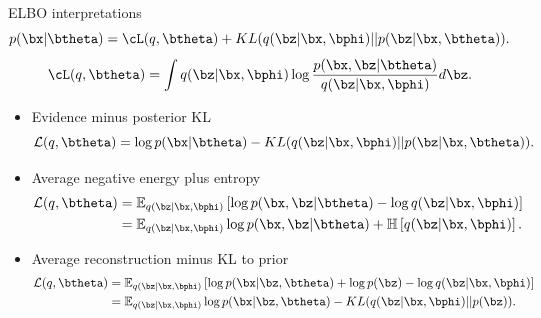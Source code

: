 \begin{frame}{ELBO interpretations}
	\[
		p(\bx | \btheta) = \cL (q, \btheta) + KL(q(\bz | \bx, \bphi) || p(\bz | \bx, \btheta)).
	\]
	\[
		\cL (q, \btheta) = \int q(\bz | \bx, \bphi) \log \frac{p(\bx, \bz | \btheta)}{q(\bz | \bx, \bphi)} d \bz.
	\]
	\begin{itemize}
	    \item Evidence minus posterior KL
	    \vspace{-0.1cm}
	    \[
	        \mathcal{L}(q, \btheta) = \log p(\bx | \btheta) - KL(q(\bz | \bx, \bphi) || p(\bz | \bx, \btheta)).
	    \]
	    \item Average negative energy plus entropy
	    \vspace{-0.1cm}
	    \begin{align*}
	        \mathcal{L}(q, \btheta) &= \mathbb{E}_{q(\bz | \bx, \bphi)} \left[\log p(\bx, \bz | \btheta) - \log q(\bz | \bx, \bphi)  \right] \\
	        &= \mathbb{E}_{q(\bz | \bx, \bphi)} \log p(\bx, \bz | \btheta) + \mathbb{H} \left[q(\bz | \bx, \bphi) \right].
	    \end{align*}
	    \item Average reconstruction minus KL to prior
	    \vspace{-0.1cm}
	    \begin{align*}
	        \mathcal{L}(q, \btheta) &= \mathbb{E}_{q(\bz | \bx, \bphi)} \left[ \log p(\bx | \bz, \btheta) + \log p(\bz) - \log q(\bz | \bx, \bphi) \right] \\
	        &= \mathbb{E}_{q(\bz | \bx, \bphi)} \log p(\bx | \bz, \btheta) - KL(q(\bz | \bx, \bphi) || p(\bz)).
	    \end{align*}
	\end{itemize}
\end{frame}
